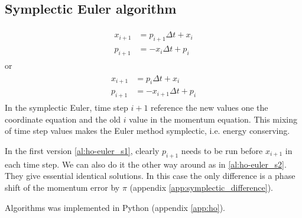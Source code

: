\subsection{Symplectic Euler algorithm}
\begin{align}
\begin{split}
\label{al:ho-euler_s1}
x_{i+1} &= p_{i+1}\Delta t + x_i  \\
p_{i+1} &= -x_i\Delta t + p_i
\end{split}
\end{align}
or
\begin{align}
\begin{split}
\label{al:ho-euler_s2}
x_{i+1} &= p_{i}\Delta t + x_i  \\
p_{i+1} &= -x_{i+1}\Delta t + p_i
\end{split}
\end{align}
In the symplectic Euler, time step $i+1$ reference the new values one the coordinate equation and the old $i$ value in the momentum equation. This mixing of time step values makes the Euler method symplectic, i.e. energy conserving.

In the first version \eqref{al:ho-euler_s1}, clearly $p_{i+1}$ needs to be run before $x_{i+1}$ in each time step. We can also do it the other way around as in \eqref{al:ho-euler_s2}. They give essential identical solutions. In this case the only difference is a phase shift of the momentum error by $\pi$ (appendix \ref{app:symplectic_difference}).

Algorithms  was implemented in Python (appendix \ref{app:ho}).

